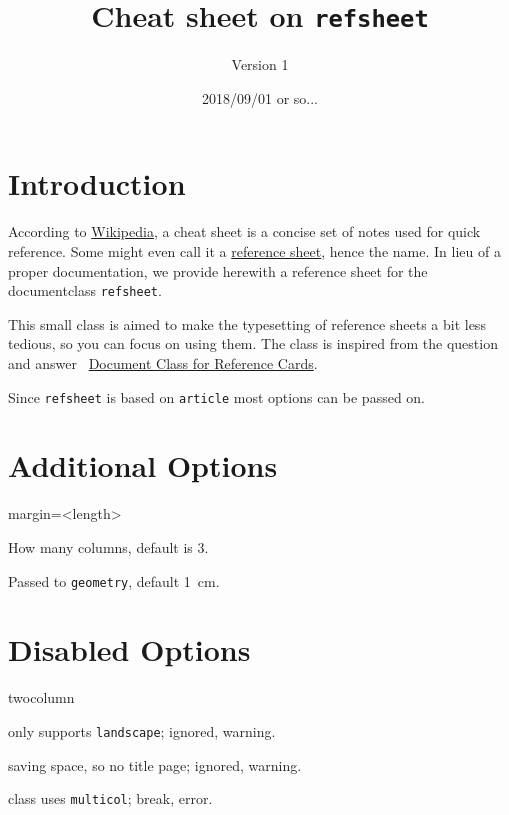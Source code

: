 \documentclass[   %
  final,          %
  a4paper,        %
  portrait,       %
  rscols=3,       %
  margin=1.0cm,   %
  titlepage,      %
]{refsheet}
\title{Cheat sheet on \texttt{refsheet}}
\author{Version 1} %
\date{2018/09/01 or so...}
\begin{document}
\maketitle

\section{Introduction}

According to \href{https://en.wikipedia.org/wiki/Cheat_sheet}{Wikipedia}, 
a cheat sheet is a concise set of notes used for quick reference.
Some might even call it a \href{https://en.wikipedia.org/wiki/Reference_card}{reference sheet}, 
hence the name.
In lieu of a proper documentation, we provide herewith a 
reference sheet for the documentclass \texttt{refsheet}.

This small class is aimed to make the typesetting of 
reference sheets a bit less tedious, so you can focus on using them.
The class is inspired from the question and answer 
\faStackExchange~\href{https://tex.stackexchange.com/q/99765}{Document Class for Reference Cards}.

Since \texttt{refsheet} is based on \texttt{article} most options can be passed on.

\section{Additional Options}

% 
% 

%
\begin{rslisttt}{margin=<length>}
  \item[rscols=<num>] How many columns, default is 3.
  \item[margin=<length>] Passed to \texttt{geometry}, default 1~cm.
\end{rslisttt}

\section{Disabled Options}

\begin{rslisttt}{twocolumn}
\item[portrait]  only supports \texttt{landscape}; ignored, warning.
\item[titlepage] saving space, so no title page; ignored, warning.
\item[twocolumn] class uses \texttt{multicol}; break, error.
\end{rslisttt}
\end{document}

